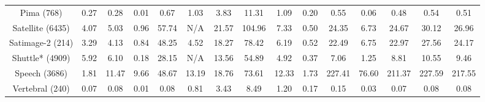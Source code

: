 \documentclass[sigconf,nonacm]{acmart}
\begin{document}
\begin{table*}[!t]
{\begin{tabular}{c||cc|ccc|cc||ccccccc}
    \multicolumn{1}{c||}{Pima (768)} & \multicolumn{1}{c}{0.27} & 0.28 & \multicolumn{1}{c}{0.01} & \multicolumn{1}{c}{0.67} &   \multicolumn{1}{c}{1.03} & \multicolumn{1}{c|}{3.83} & \multicolumn{1}{c}{11.31} & \multicolumn{1}{c||}{1.09} & \multicolumn{1}{c}{0.20} & \multicolumn{1}{c}{0.55} & \multicolumn{1}{c}{0.06} & \multicolumn{1}{c}{0.48} & \multicolumn{1}{c}{0.54} & \multicolumn{1}{c}{0.51}\\
    
    \multicolumn{1}{c||}{Satellite (6435)} & \multicolumn{1}{c}{4.07} & 5.03& \multicolumn{1}{c}{0.96} & \multicolumn{1}{c}{57.74} &   \multicolumn{1}{c}{N/A} & \multicolumn{1}{c|}{21.57} & \multicolumn{1}{c}{104.96} & \multicolumn{1}{c||}{7.33} & \multicolumn{1}{c}{0.50} & \multicolumn{1}{c}{24.35} & \multicolumn{1}{c}{6.73} & \multicolumn{1}{c}{24.67} & \multicolumn{1}{c}{30.12} & \multicolumn{1}{c}{26.96}\\
    
    \multicolumn{1}{c||}{Satimage-2 (214)} & \multicolumn{1}{c}{3.29} & 4.13 &\multicolumn{1}{c}{0.84} & \multicolumn{1}{c}{48.25} &   \multicolumn{1}{c}{4.52} & \multicolumn{1}{c|}{18.27} & \multicolumn{1}{c}{78.42} & \multicolumn{1}{c||}{6.19} & \multicolumn{1}{c}{0.52} & \multicolumn{1}{c}{22.49} & \multicolumn{1}{c}{6.75} & \multicolumn{1}{c}{22.97} & \multicolumn{1}{c}{27.56} & \multicolumn{1}{c}{24.17}\\
    
    \multicolumn{1}{c||}{Shuttle* (4909)} & \multicolumn{1}{c}{5.92}& 6.10 & \multicolumn{1}{c}{0.18} & \multicolumn{1}{c}{28.15} &   \multicolumn{1}{c}{N/A} & \multicolumn{1}{c|}{13.56} & \multicolumn{1}{c}{54.89} & \multicolumn{1}{c||}{4.92} & \multicolumn{1}{c}{0.37} & \multicolumn{1}{c}{7.06} & \multicolumn{1}{c}{1.25} & \multicolumn{1}{c}{8.81} & \multicolumn{1}{c}{10.55} & \multicolumn{1}{c}{9.46}\\
     
    \multicolumn{1}{c||}{Speech (3686)} & \multicolumn{1}{c}{1.81} & 11.47 & \multicolumn{1}{c}{9.66} & \multicolumn{1}{c}{48.67} &   \multicolumn{1}{c}{13.19} & \multicolumn{1}{c|}{18.76} & \multicolumn{1}{c}{73.61} & \multicolumn{1}{c||}{12.33} & \multicolumn{1}{c}{1.73} & \multicolumn{1}{c}{227.41} & \multicolumn{1}{c}{76.60} & \multicolumn{1}{c}{211.37} & \multicolumn{1}{c}{227.59} & \multicolumn{1}{c}{217.55}\\
    
    \multicolumn{1}{c||}{Vertebral (240)} & \multicolumn{1}{c}{0.07} &0.08 & \multicolumn{1}{c}{0.01} & \multicolumn{1}{c}{0.08} &   \multicolumn{1}{c}{0.81} & \multicolumn{1}{c|}{3.43} & \multicolumn{1}{c}{8.49} & \multicolumn{1}{c||}{1.20} & \multicolumn{1}{c}{0.17} & \multicolumn{1}{c}{0.15} & \multicolumn{1}{c}{0.03} & \multicolumn{1}{c}{0.07} & \multicolumn{1}{c}{0.08} & \multicolumn{1}{c}{0.08}\\
    

\end{tabular}}
\end{table*}
\end{document}
